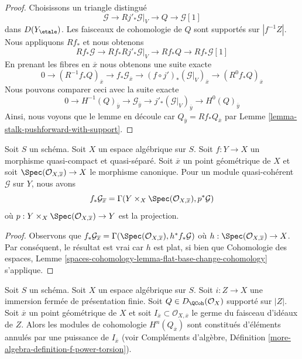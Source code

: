 \begin{proof}
Choisissons un triangle distingué
$$
\mathcal{G} \to Rj'_*\mathcal{G}|_V \to Q \to \mathcal{G}[1]
$$
dans $D(Y_\etale)$. Les faisceaux de cohomologie de $Q$
sont supportés sur $|f^{-1}Z|$. Nous appliquons $Rf_*$ et nous obtenons
$$
Rf_*\mathcal{G} \to Rf_*Rj'_*\mathcal{G}|_V \to Rf_*Q
\to Rf_*\mathcal{G}[1]
$$
En prenant les fibres en $\overline{x}$ nous obtenons une suite exacte
$$
0 \to
(R^{-1}f_*Q)_{\overline{x}} \to
f_*\mathcal{G}_{\overline{x}} \to
(f \circ j')_*(\mathcal{G}|_V)_{\overline{x}} \to
(R^0f_*Q)_{\overline{x}}
$$
Nous pouvons comparer ceci avec la suite exacte
$$
0 \to
H^{-1}(Q)_{\overline{y}} \to
\mathcal{G}_{\overline{y}} \to
j'_*(\mathcal{G}|_V)_{\overline{y}} \to
H^0(Q)_{\overline{y}}
$$
Ainsi, nous voyons que le lemme en découle car
$Q_{\overline{y}} = Rf_*Q_{\overline{x}}$ par
Lemme \ref{lemma-stalk-pushforward-with-support}.
\end{proof}

\begin{lemma}
\label{lemma-stalk-of-pushforward}
Soit $S$ un schéma. Soit $X$ un espace algébrique sur $S$.
Soit $f : Y \to X$ un morphisme quasi-compact et quasi-séparé.
Soit $\overline{x}$ un point géométrique de $X$ et soit
$\Spec(\mathcal{O}_{X, \overline{x}}) \to X$
le morphisme canonique. Pour un module quasi-cohérent
$\mathcal{G}$ sur $Y$, nous avons
$$
f_*\mathcal{G}_{\overline{x}} =
\Gamma(Y \times_X \Spec(\mathcal{O}_{X, \overline{x}}), p^*\mathcal{G})
$$
où $p : Y \times_X \Spec(\mathcal{O}_{X, \overline{x}}) \to Y$
est la projection.
\end{lemma}

\begin{proof}
Observons que $f_*\mathcal{G}_{\overline{x}} =
\Gamma(\Spec(\mathcal{O}_{X, \overline{x}}), h^*f_*\mathcal{G})$
où $h : \Spec(\mathcal{O}_{X, \overline{x}}) \to X$.
Par conséquent, le résultat est vrai car $h$ est plat, si bien que
Cohomologie des espaces, Lemme
\ref{spaces-cohomology-lemma-flat-base-change-cohomology}
s'applique.
\end{proof}

\begin{lemma}
\label{lemma-stalk-of-module-with-support}
Soit $S$ un schéma. Soit $X$ un espace algébrique sur $S$.
Soit $i : Z \to X$ une immersion fermée de présentation finie.
Soit $Q \in D_\QCoh(\mathcal{O}_X)$ supporté sur $|Z|$.
Soit $\overline{x}$ un point géométrique de $X$ et soit
$I_{\overline{x}} \subset \mathcal{O}_{X, \overline{x}}$ le germe du
faisceau d'idéaux de $Z$. Alors les modules de cohomologie
$H^n(Q_{\overline{x}})$ sont constitués d'éléments annulés par une puissance de $I_{\overline{x}}$
(voir Compléments d'algèbre, Définition
\ref{more-algebra-definition-f-power-torsion}).
\end{lemma}

